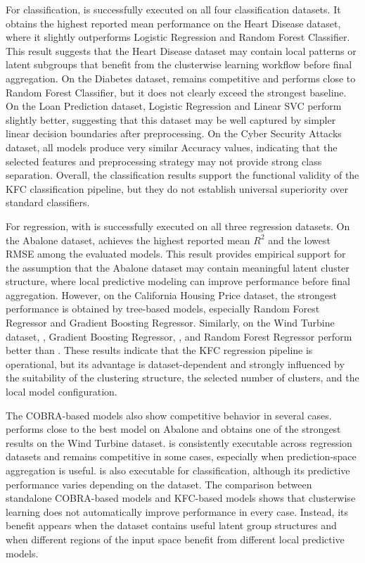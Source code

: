 For classification,  is successfully executed on all four classification datasets. It obtains the highest reported mean performance on the Heart Disease dataset, where it slightly outperforms Logistic Regression and Random Forest Classifier. This result suggests that the Heart Disease dataset may contain local patterns or latent subgroups that benefit from the clusterwise learning workflow before final aggregation. On the Diabetes dataset,  remains competitive and performs close to Random Forest Classifier, but it does not clearly exceed the strongest baseline. On the Loan Prediction dataset, Logistic Regression and Linear SVC perform slightly better, suggesting that this dataset may be well captured by simpler linear decision boundaries after preprocessing. On the Cyber Security Attacks dataset, all models produce very similar Accuracy values, indicating that the selected features and preprocessing strategy may not provide strong class separation. Overall, the classification results support the functional validity of the KFC classification pipeline, but they do not establish universal superiority over standard classifiers.

For regression,  with  is successfully executed on all three regression datasets. On the Abalone dataset,  achieves the highest reported mean $R^2$ and the lowest RMSE among the evaluated models. This result provides empirical support for the assumption that the Abalone dataset may contain meaningful latent cluster structure, where local predictive modeling can improve performance before final aggregation. However, on the California Housing Price dataset, the strongest performance is obtained by tree-based models, especially Random Forest Regressor and Gradient Boosting Regressor. Similarly, on the Wind Turbine dataset, , Gradient Boosting Regressor, , and Random Forest Regressor perform better than . These results indicate that the KFC regression pipeline is operational, but its advantage is dataset-dependent and strongly influenced by the suitability of the clustering structure, the selected number of clusters, and the local model configuration.

The COBRA-based models also show competitive behavior in several cases.  performs close to the best model on Abalone and obtains one of the strongest results on the Wind Turbine dataset.  is consistently executable across regression datasets and remains competitive in some cases, especially when prediction-space aggregation is useful.  is also executable for classification, although its predictive performance varies depending on the dataset. The comparison between standalone COBRA-based models and KFC-based models shows that clusterwise learning does not automatically improve performance in every case. Instead, its benefit appears when the dataset contains useful latent group structures and when different regions of the input space benefit from different local predictive models.

